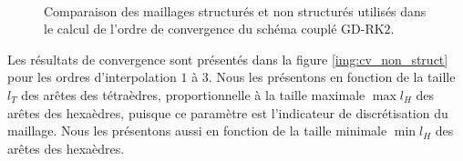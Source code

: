 \begin{figure}[!h]
	\begin{center}
		\caption{
			\label{tab:comp_struct_nstruct}
			Comparaison des maillages structurés et non structurés
			utilisés dans le calcul de l'ordre de convergence du schéma couplé GD-RK$2$.
		}
		
		\\
	\end{center}
\end{figure}


Les résultats de convergence sont présentés dans la figure \ref{img:cv_non_struct}
pour les ordres d'interpolation $1$ à $3$.
Nous les présentons en fonction de la taille $l_T$ des arêtes des tétraèdres,
proportionnelle à la taille maximale $\max l_H$ des arêtes des hexaèdres, puisque ce paramètre
est l'indicateur de discrétisation du maillage.
Nous les présentons aussi en fonction de la taille minimale $\min l_H$ des arêtes des hexaèdres.

